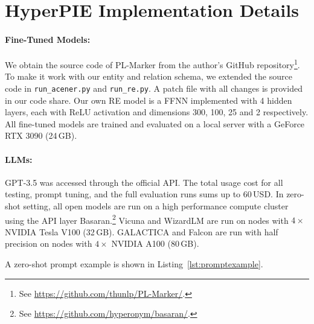 \section{HyperPIE Implementation Details}\label{sec:implementation-details}

\paragraph{Fine-Tuned Models:}
We obtain the source code of PL-Marker from the author's GitHub repository\footnote{See \url{https://github.com/thunlp/PL-Marker/}.}. To make it work with our entity and relation schema, we extended the source code in \texttt{run\_acener.py} and \texttt{run\_re.py}. A patch file with all changes is provided in our code share. Our own RE model is a FFNN implemented with 4 hidden layers, each with ReLU activation and dimensions 300, 100, 25 and 2 respectively. All fine-tuned models are trained and evaluated on a local server with a GeForce RTX 3090 (24\,GB).


\paragraph{LLMs:}
GPT-3.5 was accessed through the official API. The total usage cost for all testing, prompt tuning, and the full evaluation runs sums up to 60\,USD. In zero-shot setting, all open models are run on a high performance compute cluster using the API layer Basaran.\footnote{See \url{https://github.com/hyperonym/basaran/}.} Vicuna and WizardLM  are run on nodes with $4\times$ NVIDIA Tesla V100 (32\,GB). GALACTICA and Falcon are run with half precision on nodes with $4\times$ NVIDIA A100 (80\,GB).

A zero-shot prompt example is shown in Listing~\ref{lst:promptexample}.

